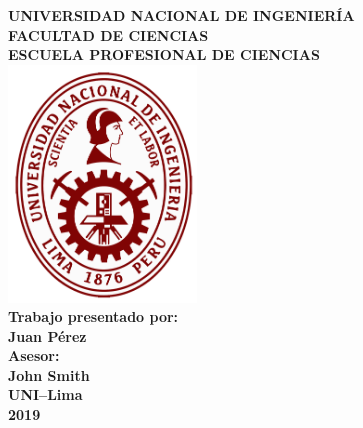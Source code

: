 \documentclass{report}
\begin{document}
\begin{titlepage}
\centering\bfseries
{\Large UNIVERSIDAD NACIONAL DE INGENIERÍA\\[5mm]

FACULTAD DE CIENCIAS\\[5mm]

ESCUELA PROFESIONAL DE CIENCIAS}\\[8mm]

\includegraphics[width=5cm]{uni}\\[8mm]

{\large Trabajo presentado por:}\\[5mm]

{\Huge Juan Pérez}\\[8mm]

{\large Asesor:}\\[5mm]

{\Huge  John Smith}\\[8mm]

{\LARGE UNI--Lima\\[5mm]

2019}
\end{titlepage}
\end{document}
